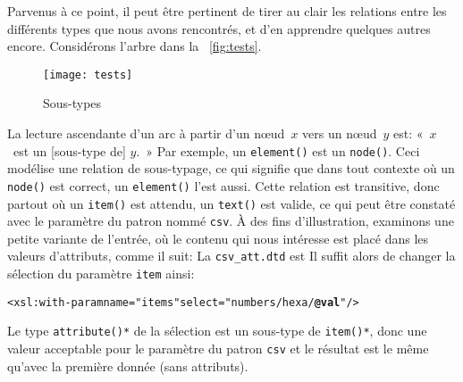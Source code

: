 Parvenus à ce point, il peut être pertinent de tirer au clair les
relations entre les différents types que nous avons rencontrés, et d'en
apprendre quelques autres encore. Considérons l'arbre dans la \fig~\vref{fig:tests}.
\begin{figure}[b]
\texttt{[image: tests]}
\caption{Sous-types \XPath}
\label{fig:tests}
\end{figure}
La lecture ascendante d'un arc à partir d'un nœud~\(x\) vers un
nœud~\(y\) est: «~\(x\)~est un [sous-type de] \(y\).~» Par exemple,
un \texttt{element()} est un \texttt{node()}. Ceci modélise une
relation de sous-typage, ce qui signifie que dans tout contexte où un
\texttt{node()} est correct, un \texttt{element()} l'est aussi. Cette
relation est transitive, donc partout où un \texttt{item()} est
attendu, un \texttt{text()} est valide, ce qui peut être constaté avec
le paramètre du patron nommé \texttt{csv}. À des fins d'illustration,
examinons une petite variante de l'entrée, où le contenu qui nous
intéresse est placé dans les valeurs d'attributs, comme il suit:
\noindent La \DTD \texttt{csv\_att.dtd} est
\noindent Il suffit alors de changer la sélection du paramètre
\texttt{item} ainsi:
\begin{alltt}
\small      <xsl:with-param name="items" select="numbers/hexa/\textbf{@val}"/>
\end{alltt}
Le type \texttt{attribute()*} de la sélection est un sous-type de
\texttt{item()*}, donc une valeur acceptable pour le paramètre du
patron \texttt{csv} et le résultat est le même qu'avec la première
donnée \XML (sans attributs).

